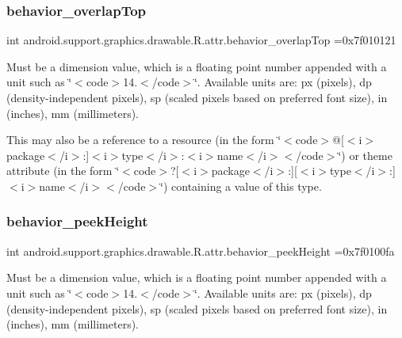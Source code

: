 \subsubsection{\texorpdfstring{behavior\+\_\+overlap\+Top}{behavior\_overlapTop}}
{\footnotesize\ttfamily int android.\+support.\+graphics.\+drawable.\+R.\+attr.\+behavior\+\_\+overlap\+Top =0x7f010121\hspace{0.3cm}{\ttfamily [static]}}

Must be a dimension value, which is a floating point number appended with a unit such as \char`\"{}$<$code$>$14.\+5sp$<$/code$>$\char`\"{}. Available units are\+: px (pixels), dp (density-\/independent pixels), sp (scaled pixels based on preferred font size), in (inches), mm (millimeters). 

This may also be a reference to a resource (in the form \char`\"{}$<$code$>$@\mbox{[}$<$i$>$package$<$/i$>$\+:\mbox{]}$<$i$>$type$<$/i$>$\+:$<$i$>$name$<$/i$>$$<$/code$>$\char`\"{}) or theme attribute (in the form \char`\"{}$<$code$>$?\mbox{[}$<$i$>$package$<$/i$>$\+:\mbox{]}\mbox{[}$<$i$>$type$<$/i$>$\+:\mbox{]}$<$i$>$name$<$/i$>$$<$/code$>$\char`\"{}) containing a value of this type. \mbox{\label{classandroid_1_1support_1_1graphics_1_1drawable_1_1R_1_1attr_a5dbee62406caa99485ee6ca681f44b36}} 
\subsubsection{\texorpdfstring{behavior\+\_\+peek\+Height}{behavior\_peekHeight}}
{\footnotesize\ttfamily int android.\+support.\+graphics.\+drawable.\+R.\+attr.\+behavior\+\_\+peek\+Height =0x7f0100fa\hspace{0.3cm}{\ttfamily [static]}}

Must be a dimension value, which is a floating point number appended with a unit such as \char`\"{}$<$code$>$14.\+5sp$<$/code$>$\char`\"{}. Available units are\+: px (pixels), dp (density-\/independent pixels), sp (scaled pixels based on preferred font size), in (inches), mm (millimeters). 

